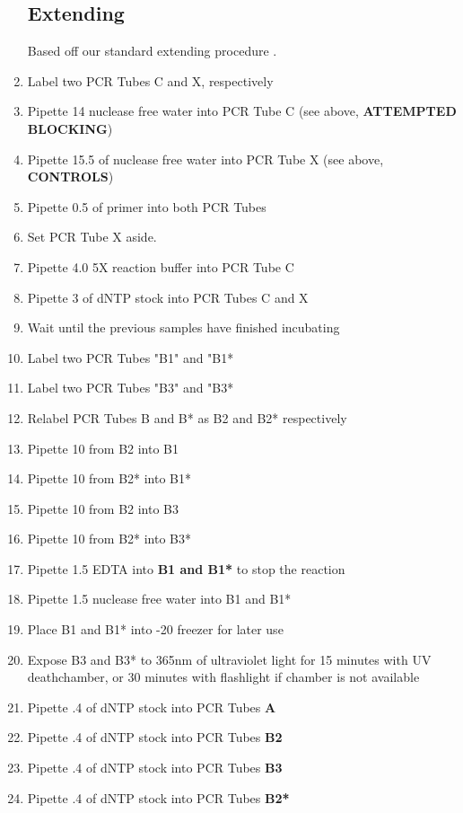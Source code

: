 \documentclass{ssiBio}
\begin{document}
\begin{enumerate}
\subsection{Extending}
Based off our standard \tdt{} extending procedure \cite{genTdT}.
\item{Label two PCR Tubes C and X, respectively}
\item{Pipette 14\uL{} nuclease free water into PCR Tube C (see above, \textbf{ATTEMPTED BLOCKING})}
\item{Pipette 15.5\uL{} of nuclease free water into PCR Tube X (see above, \textbf{CONTROLS})}
\item{Pipette 0.5\uL{} of primer into both PCR Tubes}
\item{Set PCR Tube X aside.}
\item{Pipette 4.0\uL{} 5X \tdt{} reaction buffer into PCR Tube C}
\item{Pipette 3\uL{} of dNTP stock into PCR Tubes C and X}
\item{Wait until the previous samples have finished incubating}
\item{Label two PCR Tubes "B1" and "B1*}
\item{Label two PCR Tubes "B3" and "B3*}
\item{Relabel PCR Tubes B and B* as B2 and B2* respectively}
\item{Pipette 10\uL{} from B2 into B1}
\item{Pipette 10\uL{} from B2* into B1*}
\item{Pipette 10\uL{} from B2 into B3}
\item{Pipette 10\uL{} from B2* into B3*}
\item{Pipette 1.5\uL{} EDTA into \textbf{B1 and B1*} to stop the reaction \cite{Invitrogen2002}}\\
\item{Pipette 1.5\uL{} nuclease free water into B1 and B1*}
\item{Place B1 and B1* into -20\C{} freezer for later use}
\item{Expose B3 and B3* to 365nm of ultraviolet light for 15 minutes with UV deathchamber, or 30 minutes with flashlight if chamber is not available}
\item{Pipette .4\uL{} of dNTP stock into PCR Tubes \textbf{A}}
\item{Pipette .4\uL{} of dNTP stock into PCR Tubes \textbf{B2}}
\item{Pipette .4\uL{} of dNTP stock into PCR Tubes \textbf{B3}}
\item{Pipette .4\uL{} of dNTP stock into PCR Tubes \textbf{B2*}}

\end{enumerate}
\end{document}
